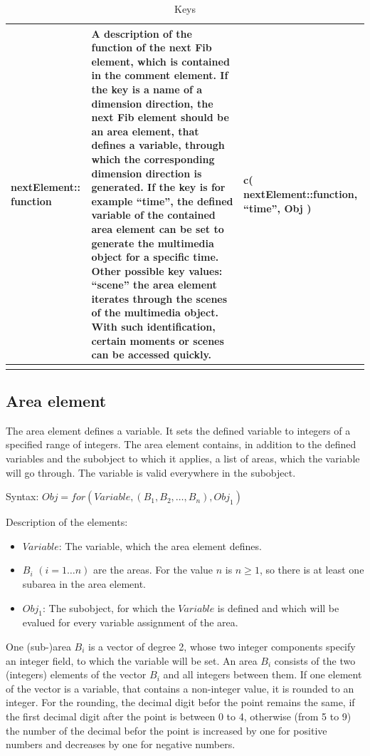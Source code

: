 \begin{center}
\begin{longtable}{|p{20mm}|p{55mm}|p{50mm}|}
	nextElement:: function & A description of the function of the next Fib element, which is contained in the comment element. If the key is a name of a dimension direction, the next Fib element should be an area element, that defines a variable, through which the corresponding dimension direction is generated. If the key is for example ``time'', the defined variable of the contained area element can be set to generate the multimedia object for a specific time. Other possible key values: ``scene'' the area element iterates through the scenes of the multimedia object. With such identification, certain moments or scenes can be accessed quickly. & c( nextElement::function, ``time'', Obj )\\\hline
\caption{Keys}
\label{tabPropertyKeys}
\end{longtable}
\end{center}



\subsection{Area element}
\label{fibArea}\label{secFibArea}

The area element defines a variable. It sets the defined variable to integers of a specified range of integers. The area element contains, in addition to the defined variables and the subobject to which it applies, a list of areas, which the variable will go through. The variable is valid everywhere in the subobject.

\bigskip\noindent
Syntax:
$Obj = for( Variable,(B_{1}, B_{2},\ldots, B_{n}), Obj_1 )$

\bigskip\noindent
Description of the elements:
\begin{itemize}
 \item $Variable$: The variable, which the area element defines.
 \item $B_{i}$ $(i = 1 \ldots n)$ are the areas. For the value $n$ is $n \geq 1$, so there is at least one subarea in the area element.
 \item $Obj_1$: The subobject, for which the $Variable$ is defined and which will be evalued for every variable assignment of the area.
\end{itemize}

One (sub-)area $B_{i}$ is a vector of degree 2, whose two integer components specify an integer field, to which the variable will be set. An area $B_{i}$ consists of the two (integers) elements of the vector $ B_{i} $ and all integers between them.
If one element of the vector is a variable, that contains a non-integer value, it is rounded to an integer. For the rounding, the decimal digit befor the point remains the same, if the first decimal digit after the point is between 0 to 4, otherwise (from 5 to 9) the number of the decimal befor the point is increased by one for positive numbers and decreases by one for negative numbers.

